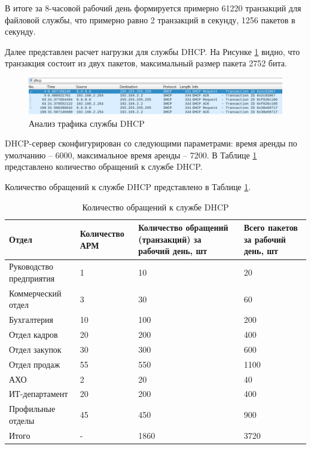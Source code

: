 \documentclass[14pt, a4paper]{extarticle}
\numberwithin{equation}{section}
\begin{document}
В итоге за 8-часовой рабочий день формируется примерно 61220 транзакций для 
файловой службы, что примерно равно 
2 транзакций в секунду, 1256 пакетов в секунду.

Далее представлен расчет нагрузки для службы DHCP. На Рисунке \ref{fig:wireshark_dhcp_dump} видно, что транзакция состоит из двух пакетов,
максимальный размер пакета 2752 бита.

\begin{figure}[H]
        \centering
        \includegraphics[scale=0.5]{dhcp_wireshark.png}
        \caption{Анализ трафика службы DHCP}
        \label{fig:wireshark_dhcp_dump}
\end{figure}

DHCP-сервер сконфигурирован со следующими параметрами: 
время аренды по умолчанию – 6000, максимальное время аренды – 7200.
В Таблице \ref{table:dhcp_requests} представлено количество обращений к службе DHCP. 


Количество обращений к службе DHCP представлено в Таблице \ref{table:dhcp_requests}.
\begin{table}[H]
\centering
\small
\caption{Количество обращений к службе DHCP}
\label{table:dhcp_requests}
\begin{tabular}{|m{3cm}|m{3cm}|m{4cm}|m{3cm}|}
\hline
\textbf{Отдел} & \textbf{Количество АРМ} & \textbf{Количество обращений (транзакций) за рабочий день, шт } & \textbf{Всего пакетов за рабочий день, шт }\\
\hline
Руководство предприятия & 1 & 10 & 20\\
\hline
Коммерческий отдел & 3 & 30 & 60 \\
\hline
Бухгалтерия & 10 & 100 & 200\\
\hline
Отдел кадров & 20 & 200 & 400\\
\hline
Отдел закупок & 30 & 300 & 600\\
\hline
Отдел продаж & 55 & 550 & 1100\\
\hline
АХО & 2 & 20 & 40\\
\hline
ИТ-департамент & 20 & 200 & 400\\
\hline
Профильные отделы & 45 & 450 & 900\\
\hline
Итого & - & 1860 & 3720\\
\hline
\end{tabular}
\end{table}
\end{document}
